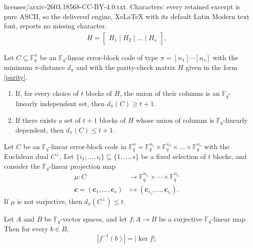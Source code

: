 \documentclass[10pt,a4paper]{amsart}
\begin{document}
licenses/arxiv-2603.18568-CC-BY-4.0.txt. Characters: every retained excerpt is pure ASCII, so the delivered engine, XeLaTeX with its default Latin Modern text font, reports no missing character.
\begin{align}\label{parity}
    H = \begin{bmatrix}
H_1 \mid H_2 \mid \dots \mid H_s
\end{bmatrix},
\end{align}

\begin{Lemma}\label{ma14}
Let $C\subseteq\mathbb F_q^n$ be an $\mathbb F_q$-linear error-block code of type $\pi=[n_1]\cdots[n_s]$ with the minimum $\pi$-distance $d_{\pi}$ and with the parity-check matrix $H$ given in the form \eqref{parity}.
\begin{enumerate}
    \item If, for every choice of $t$ blocks of $H$, the union of their columns is an $\mathbb F_q$-linearly independent set, then $d_{\pi}(C)\ge t+1.$
    \item If there exists a set of $t+1$ blocks of $H$ whose union of columns is $\mathbb F_q$-linearly dependent, then $d_\pi(C)\le t+1.$
\end{enumerate}
\end{Lemma}

\begin{Lemma}\label{surjective}
Let $C$ be an $\mathbb F_q$-linear error-block code in $ \mathbb{F}_q^n =\mathbb{F}_q^{n_1}\times \mathbb{F}_q^{n_2} \times \ldots\times \mathbb{F}_q^{n_s}$ with the Euclidean dual $C^\perp$. Let $\{i_1,\ldots,i_t\}\subseteq\{1,\ldots,s\}$ be a fixed selection of $t$ blocks, and consider the $\mathbb F_q$-linear projection map
        \begin{align*}
         \mu : C &\to \mathbb{F}_{q}^{n_{i_1}} \times \cdots \times \mathbb{F}_{q}^{n_{i_t}}\\  
          \mathbf c=(\mathbf c_1,\ldots,\mathbf c_s)&\mapsto(\mathbf c_{i_1},\ldots,\mathbf c_{i_t}).
        \end{align*}
If $\mu$ is not surjective, then $d_\pi(C^\perp)\le t$.
\end{Lemma}

\begin{Lemma} \label{coset}
Let $A$ and $B$ be $\mathbb F_q$-vector spaces, and let $f: A \to B$ be a surjective $\mathbb F_q$-linear map. Then for every $b \in B$,
$$|f^{-1}(b)| = |\ker f|.$$
\end{Lemma}
\end{document}
